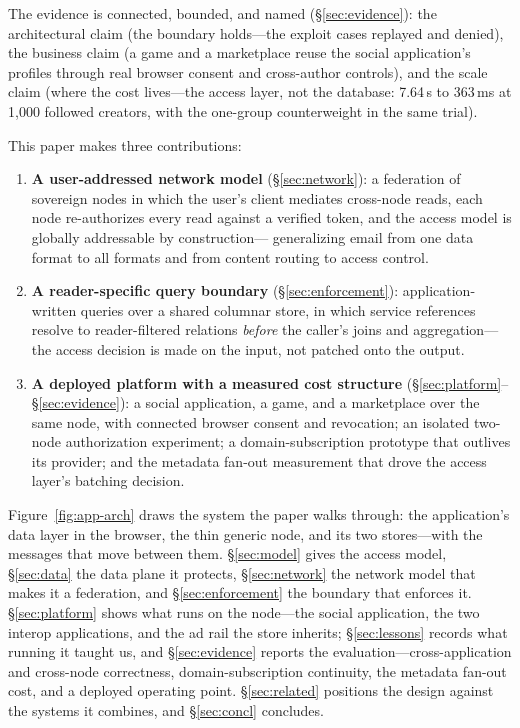 \documentclass[sigconf, nonacm]{acmart}
\begin{document}
The evidence is connected, bounded, and named (\S\ref{sec:evidence}): the
architectural claim (the boundary holds---the exploit cases replayed and
denied), the business claim (a game and a marketplace reuse the social
application's profiles through real browser consent and cross-author
controls), and the scale claim (where the cost lives---the access layer, not
the database: 7.64\,s to 363\,ms at 1,000 followed creators, with the
one-group counterweight in the same trial).

This paper makes three contributions:

\begin{enumerate}[leftmargin=*,nosep]
  \item \textbf{A user-addressed network model} (\S\ref{sec:network}): a
  federation of sovereign nodes in which the user's client mediates
  cross-node reads, each node re-authorizes every read against a verified
  token, and the access model is globally addressable by construction---
  generalizing email from one data format to all formats and from content
  routing to access control.
  \item \textbf{A reader-specific query boundary}
  (\S\ref{sec:enforcement}): application-written queries over a shared
  columnar store, in which service references resolve to reader-filtered
  relations \emph{before} the caller's joins and aggregation---the access
  decision is made on the input, not patched onto the output.
  \item \textbf{A deployed platform with a measured cost structure}
  (\S\ref{sec:platform}--\S\ref{sec:evidence}): a social application, a
  game, and a marketplace over the same node, with connected browser consent
  and revocation; an isolated two-node authorization experiment; a
  domain-subscription prototype that outlives its provider; and the
  metadata fan-out measurement that drove the access layer's batching
  decision.
\end{enumerate}

Figure~\ref{fig:app-arch} draws the system the paper walks through: the
application's data layer in the browser, the thin generic node, and its two
stores---with the messages that move between them. \S\ref{sec:model} gives
the access model, \S\ref{sec:data} the data plane it protects,
\S\ref{sec:network} the network model that makes it a federation, and
\S\ref{sec:enforcement} the boundary that enforces it.
\S\ref{sec:platform} shows what runs on the node---the social application,
the two interop applications, and the ad rail the store inherits;
\S\ref{sec:lessons} records what running it taught us, and
\S\ref{sec:evidence} reports the evaluation---cross-application and
cross-node correctness, domain-subscription continuity, the metadata
fan-out cost, and a deployed operating point. \S\ref{sec:related} positions
the design against the systems it combines, and \S\ref{sec:concl} concludes.
\end{document}
